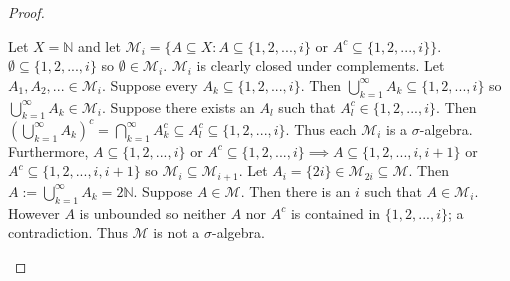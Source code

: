 \documentclass{article}
\begin{document}
\begin{proof}
\begin{enumerate}
    Let $X=\mathbb{N}$ and let $\mathcal{M}_i=\{A\subseteq X:A\subseteq\{1,2,...,i\}\text{ or }A^c\subseteq\{1,2,...,i\}\}$. $\emptyset\subseteq\{1,2,...,i\}$ so $\emptyset\in\mathcal{M}_i$. $\mathcal{M}_i$ is clearly closed under complements. Let $A_1,A_2,...\in\mathcal{M}_i$. Suppose every $A_k\subseteq\{1,2,...,i\}$. Then $\bigcup_{k=1}^\infty A_k\subseteq\{1,2,...,i\}$ so $\bigcup_{k=1}^\infty A_k\in\mathcal{M}_i$. Suppose there exists an $A_l$ such that $A_l^c\in\{1,2,...,i\}$. Then $(\bigcup_{k=1}^\infty A_k)^c=\bigcap_{k=1}^\infty A_k^c\subseteq A_l^c\subseteq\{1,2,...,i\}$. Thus each $\mathcal{M}_i$ is a $\sigma$-algebra. Furthermore, $A\subseteq\{1,2,...,i\}$ or $A^c\subseteq\{1,2,...,i\}\implies A\subseteq\{1,2,...,i,i+1\}$ or $A^c\subseteq\{1,2,...,i,i+1\}$ so $\mathcal{M}_i\subseteq\mathcal{M}_{i+1}$. Let $A_i=\{2i\}\in\mathcal{M}_{2i}\subseteq\mathcal{M}$. Then $A:=\bigcup_{k=1}^\infty A_k=2\mathbb{N}$. Suppose $A\in\mathcal{M}$. Then there is an $i$ such that $A\in\mathcal{M}_i$. However $A$ is unbounded so neither $A$ nor $A^c$ is contained in $\{1,2,...,i\}$; a contradiction. Thus $\mathcal{M}$ is not a $\sigma$-algebra.
\end{enumerate}
\end{proof}
\end{document}
